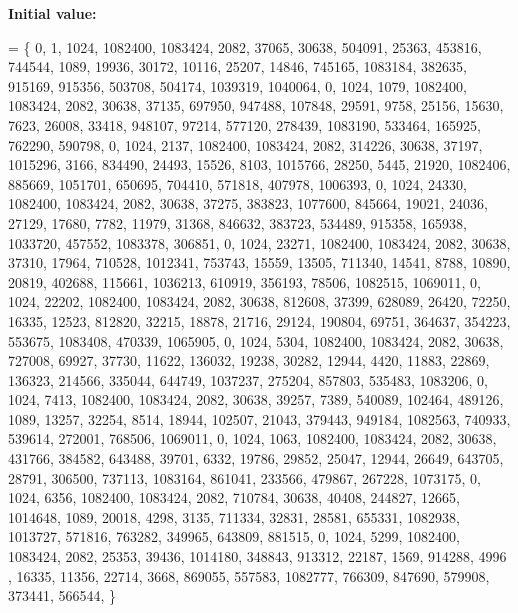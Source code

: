 {\bfseries Initial value\+:}
\begin{DoxyCode}
= \{ 
    0, 1, 1024, 1082400, 1083424, 2082, 37065, 30638, 504091, 25363, 453816, 744544, 1089, 19936, 30172, 
      10116, 25207, 14846, 745165, 1083184, 382635, 915169, 915356, 503708, 504174, 1039319, 1040064, 
    0, 1024, 1079, 1082400, 1083424, 2082, 30638, 37135, 697950, 947488, 107848, 29591, 9758, 25156, 15630,
       7623, 26008, 33418, 948107, 97214, 577120, 278439, 1083190, 533464, 165925, 762290, 590798, 
    0, 1024, 2137, 1082400, 1083424, 2082, 314226, 30638, 37197, 1015296, 3166, 834490, 24493, 15526, 8103,
       1015766, 28250, 5445, 21920, 1082406, 885669, 1051701, 650695, 704410, 571818, 407978, 1006393, 
    0, 1024, 24330, 1082400, 1083424, 2082, 30638, 37275, 383823, 1077600, 845664, 19021, 24036, 27129, 
      17680, 7782, 11979, 31368, 846632, 383723, 534489, 915358, 165938, 1033720, 457552, 1083378, 306851, 
    0, 1024, 23271, 1082400, 1083424, 2082, 30638, 37310, 17964, 710528, 1012341, 753743, 15559, 13505, 
      711340, 14541, 8788, 10890, 20819, 402688, 115661, 1036213, 610919, 356193, 78506, 1082515, 1069011, 
    0, 1024, 22202, 1082400, 1083424, 2082, 30638, 812608, 37399, 628089, 26420, 72250, 16335, 12523, 
      812820, 32215, 18878, 21716, 29124, 190804, 69751, 364637, 354223, 553675, 1083408, 470339, 1065905, 
    0, 1024, 5304, 1082400, 1083424, 2082, 30638, 727008, 69927, 37730, 11622, 136032, 19238, 30282, 12944,
       4420, 11883, 22869, 136323, 214566, 335044, 644749, 1037237, 275204, 857803, 535483, 1083206, 
    0, 1024, 7413, 1082400, 1083424, 2082, 30638, 39257, 7389, 540089, 102464, 489126, 1089, 13257, 32254, 
      8514, 18944, 102507, 21043, 379443, 949184, 1082563, 740933, 539614, 272001, 768506, 1069011, 
    0, 1024, 1063, 1082400, 1083424, 2082, 30638, 431766, 384582, 643488, 39701, 6332, 19786, 29852, 25047,
       12944, 26649, 643705, 28791, 306500, 737113, 1083164, 861041, 233566, 479867, 267228, 1073175, 
    0, 1024, 6356, 1082400, 1083424, 2082, 710784, 30638, 40408, 244827, 12665, 1014648, 1089, 20018, 4298,
       3135, 711334, 32831, 28581, 655331, 1082938, 1013727, 571816, 763282, 349965, 643809, 881515, 
    0, 1024, 5299, 1082400, 1083424, 2082, 25353, 39436, 1014180, 348843, 913312, 22187, 1569, 914288, 4996
      , 16335, 11356, 22714, 3668, 869055, 557583, 1082777, 766309, 847690, 579908, 373441, 566544, 
\}
\end{DoxyCode}
\mbox{\label{surface__32_8_c_afd90a1d57467eb39abfc42e73f12d738}} 
